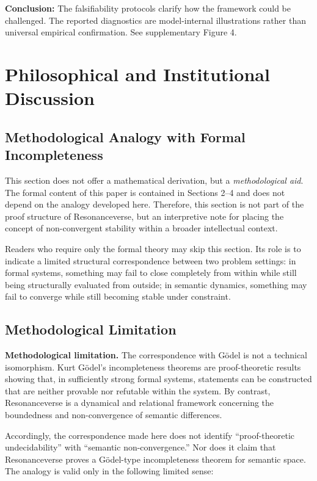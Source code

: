 \documentclass[11pt,a4paper]{article}
\theoremstyle{definition}
\begin{document}
\textbf{Conclusion:} The falsifiability protocols clarify how the framework could be challenged. The reported diagnostics are model-internal illustrations rather than universal empirical confirmation. See supplementary Figure 4.

\section{Philosophical and Institutional Discussion}
\subsection{Methodological Analogy with Formal Incompleteness}

This section does not offer a mathematical derivation, but a \textit{methodological aid}. The formal content of this paper is contained in Sections 2--4 and does not depend on the analogy developed here. Therefore, this section is not part of the proof structure of Resonanceverse, but an interpretive note for placing the concept of non-convergent stability within a broader intellectual context.

Readers who require only the formal theory may skip this section. Its role is to indicate a limited structural correspondence between two problem settings: in formal systems, something may fail to close completely from within while still being structurally evaluated from outside; in semantic dynamics, something may fail to converge while still becoming stable under constraint.

\subsection{Methodological Limitation}

\textbf{Methodological limitation.} The correspondence with G\"odel is not a technical isomorphism. Kurt G\"odel's incompleteness theorems are proof-theoretic results showing that, in sufficiently strong formal systems, statements can be constructed that are neither provable nor refutable within the system. By contrast, Resonanceverse is a dynamical and relational framework concerning the boundedness and non-convergence of semantic differences.

Accordingly, the correspondence made here does not identify ``proof-theoretic undecidability'' with ``semantic non-convergence.'' Nor does it claim that Resonanceverse proves a G\"odel-type incompleteness theorem for semantic space. The analogy is valid only in the following limited sense:
\end{document}
